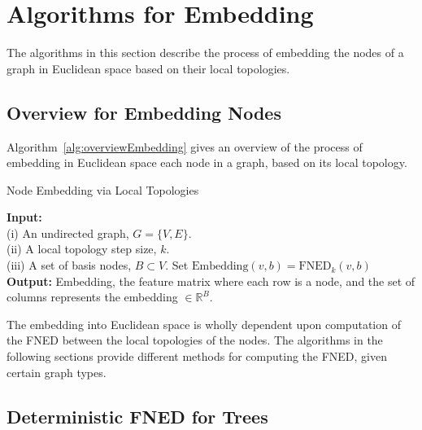 \documentclass{article}
\begin{document}
\section{Algorithms for Embedding}
\label{sec:algos}
The algorithms in this section describe the process of embedding the nodes of a graph in Euclidean space based on their local topologies.

\subsection{Overview for Embedding Nodes}
Algorithm~\ref{alg:overviewEmbedding} gives an overview of the process of embedding in Euclidean space each node in a graph, based on its local topology.

\begin{algorithm}[h!tbp]
\caption{Node Embedding via Local Topologies}
\label{alg:overviewEmbedding}
\begin{algorithmic}[1]
\STATE \textbf{Input:} \\(i) An undirected graph, $G = \{V,E\}$.\\(ii) A local topology step size, $k$.\\(iii) A set of basis nodes, $B \subset V$.
\STATE Set $\text{Embedding}(v,b) = \text{FNED}_{k}(v,b)$
\ENDFOR
\ENDFOR
\STATE \textbf{Output:} Embedding, the feature matrix where each row is a node, and the set of columns represents the embedding $\in \mathbb{R}^{B}$.
\end{algorithmic}
\end{algorithm}

The embedding into Euclidean space is wholly dependent upon computation of the FNED between the local topologies of the nodes. The algorithms in the following sections provide different methods for computing the FNED, given certain graph types.


\subsection{Deterministic FNED for Trees}
\end{document}

